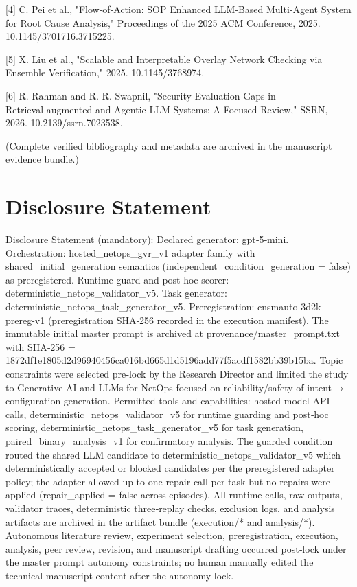 \documentclass[conference]{IEEEtran}
\begin{document}
[4] C. Pei et al., "Flow‑of‑Action: SOP Enhanced LLM‑Based Multi‑Agent System for Root Cause Analysis," Proceedings of the 2025 ACM Conference, 2025. 10.1145/3701716.3715225.

[5] X. Liu et al., "Scalable and Interpretable Overlay Network Checking via Ensemble Verification," 2025. 10.1145/3768974.

[6] R. Rahman and R. R. Swapnil, "Security Evaluation Gaps in Retrieval‑augmented and Agentic LLM Systems: A Focused Review," SSRN, 2026. 10.2139/ssrn.7023538.

(Complete verified bibliography and metadata are archived in the manuscript evidence bundle.)

\section*{Disclosure Statement}
Disclosure Statement (mandatory): Declared generator: gpt‑5‑mini. Orchestration: hosted\_netops\_gvr\_v1 adapter family with shared\_initial\_generation semantics (independent\_condition\_generation = false) as preregistered. Runtime guard and post‑hoc scorer: deterministic\_netops\_validator\_v5. Task generator: deterministic\_netops\_task\_generator\_v5. Preregistration: cnsmauto-3d2k-prereg-v1 (preregistration SHA‑256 recorded in the execution manifest). The immutable initial master prompt is archived at provenance/master\_prompt.txt with SHA‑256 = 1872df1e\allowbreak{}1805d2d9\allowbreak{}6940456c\allowbreak{}a016bd66\allowbreak{}5d1d5196\allowbreak{}add77f5a\allowbreak{}cdf1582b\allowbreak{}b39b15ba. Topic constraints were selected pre‑lock by the Research Director and limited the study to Generative AI and LLMs for NetOps focused on reliability/safety of intent\ensuremath{\rightarrow}configuration generation. Permitted tools and capabilities: hosted model API calls, deterministic\_netops\_validator\_v5 for runtime guarding and post‑hoc scoring, deterministic\_netops\_task\_generator\_v5 for task generation, paired\_binary\_analysis\_v1 for confirmatory analysis. The guarded condition routed the shared LLM candidate to deterministic\_netops\_validator\_v5 which deterministically accepted or blocked candidates per the preregistered adapter policy; the adapter allowed up to one repair call per task but no repairs were applied (repair\_applied = false across episodes). All runtime calls, raw outputs, validator traces, deterministic three‑replay checks, exclusion logs, and analysis artifacts are archived in the artifact bundle (execution/* and analysis/*). Autonomous literature review, experiment selection, preregistration, execution, analysis, peer review, revision, and manuscript drafting occurred post‑lock under the master prompt autonomy constraints; no human manually edited the technical manuscript content after the autonomy lock.
\end{document}
